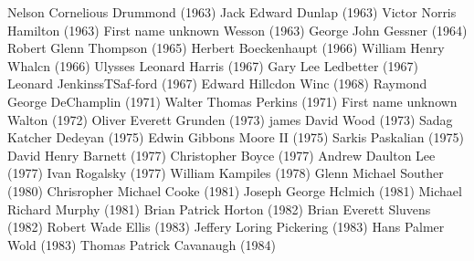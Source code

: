 \documentclass[12pt]{article}
\begin{document}
\begin{multicols}{2}
Nelson Cornelious Drummond (1963)\newline
Jack Edward Dunlap (1963)\newline
Victor Norris Hamilton (1963)\newline
First name unknown Wesson (1963)\newline
George John Gessner (1964)\newline
Robert Glenn Thompson (1965)\newline
Herbert Boeckenhaupt (1966)\newline
William Henry Whalcn (1966)\newline
Ulysses Leonard Harris (1967)\newline
Gary Lee Ledbetter (1967)\newline
Leonard JenkinssTSaf-ford (1967)\newline
Edward Hillcdon Winc (1968)\newline
Raymond George DeChamplin (1971)\newline
Walter Thomas Perkins (1971)\newline
First name unknown Walton (1972)\newline
Oliver Everett Grunden (1973)\newline
james David Wood (1973)\newline
Sadag Katcher Dedeyan (1975)\newline
Edwin Gibbons Moore II (1975)\newline
Sarkis Paskalian (1975)\newline
David Henry Barnett (1977)\newline
Christopher Boyce (1977)\newline
Andrew Daulton Lee (1977)\newline
Ivan Rogalsky (1977)\newline
William Kampiles (1978)\newline
Glenn Michael Souther (1980)\newline
Chrisropher Michael Cooke (1981)\newline
Joseph George Hclmich (1981)\newline
Michael Richard Murphy (1981)\newline
Brian Patrick Horton (1982)\newline
Brian Everett Sluvens (1982)\newline
Robert Wade Ellis (1983)\newline
Jeffery Loring Pickering (1983)\newline
Hans Palmer Wold (1983)\newline
Thomas Patrick Cavanaugh (1984)\newline

\end{multicols}
\end{document}
